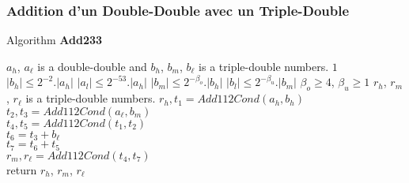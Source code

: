 \subsubsection{Addition d'un Double-Double avec un Triple-Double}

\begin{algorithm}[htbp]
  \caption{Algorithm \textbf{Add233}}
\begin{algorithmic}[1]
\Input $a_h$, $a_{\ell}$  is a double-double and $b_h$, $b_m$, $b_{\ell}$ is a triple-double numbers.
\Condition $1$ $\lvert b_h \rvert \le 2^{-2}.\lvert a_h \rvert$
\Condition $\lvert a_l \rvert \le 2^{-53} .\lvert a_h \rvert$
\Condition $\lvert b_m \rvert \le 2^{-\beta_o} .\lvert b_h \rvert$
\Condition $\lvert b_l \rvert \le 2^{-\beta_u} .\lvert b_m \rvert$
\Condition $\beta_o \ge 4$, $\beta_u \ge 1$ 
\Output $r_h$, $r_m$, $r_{\ell}$ is a triple-double numbers.
\State $r_h,t_1 = Add112Cond(a_h,b_h)$\\
    $t_2,t_3 = Add112Cond(a_{\ell},b_m)$\\
    $t_4,t_5 = Add112Cond(t_1,t_2)$\\
    $t_6 = t_3+b_{\ell}$\\
    $t_7 = t_6+t_5$\\
    $r_m,r_{\ell} = Add112Cond(t_4,t_7)$\\
    return $r_h$, $r_m$, $r_{\ell}$
\end{algorithmic}
\end{algorithm}